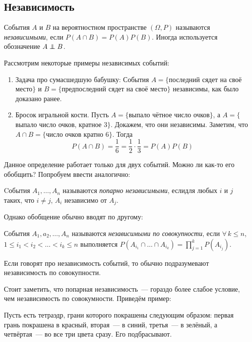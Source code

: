 \documentclass[a4paper,12pt]{article}
\begin{document}
	\subsection{Независимость}
	\begin{definition}
		События \(A\) и \(B\) на вероятностном пространстве \((\Omega, P)\) называются \emph{независимыми}, если \(P(A \cap B) = P(A)P(B)\). Иногда используется обозначение \(A \independent B\).
	\end{definition}
	Рассмотрим некоторые примеры независимых событий:
	\begin{enumerate}
		\item Задача про сумасшедшую бабушку: События \(A = \{\)последний сядет на своё место\(\}\) и \(B = \{\)предпоследний сядет на своё место\(\}\) независимы, как было доказано ранее.
		
		\item Бросок игральной кости. Пусть \(A = \{\)выпало чётное число очков\(\}\), а \(A = \{\)выпало число очков, кратное 3\(\}\). Докажем, что они независимы. Заметим, что \(A \cap B = \{\)число очков кратно 6\(\}\). Тогда \[P(A \cap B) = \frac{1}{6} = \frac{1}{2} \cdot \frac{1}{3} = P(A)P(B)\]
	\end{enumerate}
	Данное определение работает только для двух событий. Можно ли как-то его обобщить? Попробуем ввести аналогично:
	\begin{definition}
		Cобытия \(A_1, \ldots, A_n\) называются \emph{попарно независимыми}, еслидля любых \(i\) и \(j\) таких, что \(i \neq j\), \(A_i\) независимо от \(A_j\).
	\end{definition}
	Однако обобщение обычно вводят по другому:
	\begin{definition}
		События \(A_1, a_2, \ldots, A_n\) называются \emph{независимыми по совокупности}, если \(\forall\,k \leq n\), \(1 \leq i_1 < i_2 < \ldots < i_k \leq n\) выполняется \(P(A_{i_1}\cap\ldots\cap A_{i_k}) = \prod\limits_{j = 1}^{k} P(A_{i_j})\).
	\end{definition}
	\begin{remark}
		Если говорят про независимость событий, то обычно подразумевают независимость по совокупности.
	\end{remark}
	
	Стоит заметить, что попарная независимость~--- гораздо более слабое условие, чем независимость по совокумности. Приведём пример:
	
	Пусть есть тетраэдр, грани которого покрашены следующим образом: первая грань покрашена в красный, вторая~--- в синий, третья~--- в зелёный, а четвёртая~--- во все три цвета сразу. Его подбрасывают.
	
\end{document}

